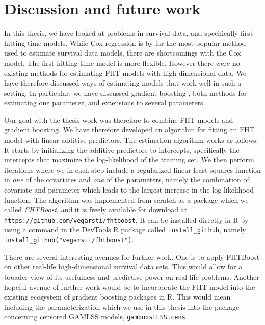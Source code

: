 \chapter{Discussion and future work}
\label{sec:discussion}
In this thesis, we have looked at problems in survival data, and specifically first hitting time models.
While Cox regression is by far the most popular method used to estimate survival data models, there are shortcomings with the Cox model.
The first hitting time model is more flexible.
However there were no existing methods for estimating FHT models with high-dimensional data.
We have therefore discussed ways of estimating models that work well in such a setting.
In particular, we have discussed gradient boosting \citep{friedman2001}, both methods for estimating one parameter, and extensions to several parameters.

Our goal with the thesis work was therefore to combine FHT models and gradient boosting.
We have therefore developed an algorithm for fitting an FHT model with linear additive predictors.
The estimation algorithm works as follows.
It starts by initializing the additive predictors to intercepts, specifically the intercepts that maximize the log-likelihood of the training set.
We then perform iterations where we in each step include a regularized linear least squares function in \textit{one} of the covariates and \textit{one} of the parameters, namely the combination of covariate and parameter which leads to the largest increase in the log-likelihood function.
The algorithm was implemented from scratch as a package which we called \textit{FHTBoost}, and it is freely available for download at \verb|https://github.com/vegarsti/fhtboost|.
It can be installed directly in R by using a command in the DevTools R package \citep{devtools} called \verb|install_github|, namely \verb|install_github("vegarsti/fhtboost")|.

There are several interesting avenues for further work.
One is to apply FHTBoost on other real-life high-dimensional survival data sets.
This would allow for a broader view of its usefulness and predictive power on real-life problems.
Another hopeful avenue of further work would be to incorporate the FHT model into the existing ecosystem of gradient boosting packages in R.
This would mean including the parameterization which we use in this thesis into the package concerning censored GAMLSS models, \verb|gamboostLSS.cens| \citep{gamlsscens}.